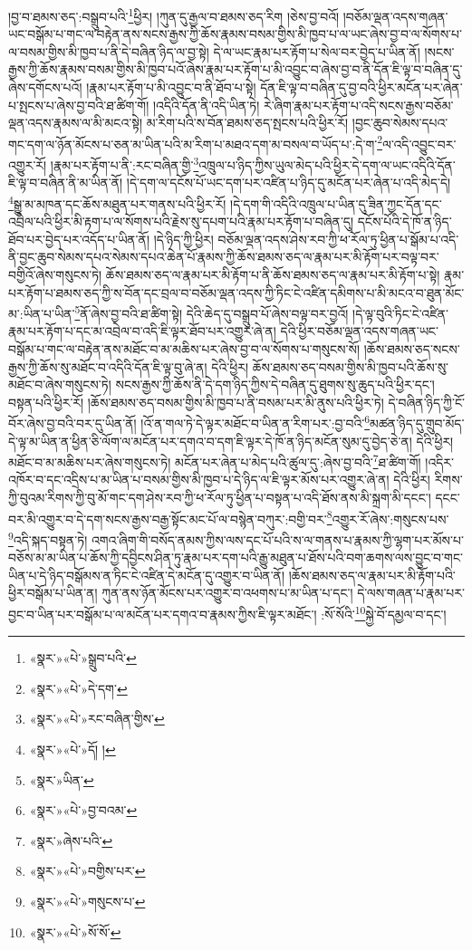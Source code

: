།བྱ་བ་ཐམས་ཅད་:བསྒྲུབ་པའི་\footnote{«སྣར་»«པེ་»སྒྲུབ་པའི་}ཕྱིར། །ཀུན་དུ་རྒྱལ་བ་ཐམས་ཅད་རིག །ཅེས་བྱ་བའོ། །བཅོམ་ལྡན་འདས་གཞན་ཡང་བསྒོམ་པ་གང་ལ་བརྟེན་ནས་སངས་རྒྱས་ཀྱི་ཆོས་རྣམས་བསམ་གྱིས་མི་ཁྱབ་པ་ལ་ཡང་ཞེས་བྱ་བ་ལ་སོགས་པ་ལ་བསམ་གྱིས་མི་ཁྱབ་པ་ནི་དེ་བཞིན་ཉིད་ལ་བྱ་སྟེ། དེ་ལ་ཡང་རྣམ་པར་རྟོག་པ་སེལ་བར་བྱེད་པ་ཡིན་ནོ། །སངས་རྒྱས་ཀྱི་ཆོས་རྣམས་བསམ་གྱིས་མི་ཁྱབ་པའོ་ཞེས་རྣམ་པར་རྟོག་པ་མི་འབྱུང་བ་ཞེས་བྱ་བ་ནི་དོན་ཇི་ལྟ་བ་བཞིན་དུ་ཞེས་དགོངས་པའོ། །རྣམ་པར་རྟོག་པ་མི་འབྱུང་བ་ནི་ཐོབ་པ་སྟེ། དོན་ཇི་ལྟ་བ་བཞིན་དུ་བྱ་བའི་ཕྱིར་མངོན་པར་ཞེན་པ་སྤངས་པ་ཞེས་བྱ་བའི་ཐ་ཚིག་གོ། །འདིའི་དོན་ནི་འདི་ཡིན་ཏེ། རེ་ཞིག་རྣམ་པར་རྟོག་པ་འདི་སངས་རྒྱས་བཅོམ་ལྡན་འདས་རྣམས་ལ་མི་མངའ་སྟེ། མ་རིག་པའི་ས་བོན་ཐམས་ཅད་སྤངས་པའི་ཕྱིར་རོ། །བྱང་ཆུབ་སེམས་དཔའ་གང་དག་ལ་ཉོན་མོངས་པ་ཅན་མ་ཡིན་པའི་མ་རིག་པ་མཐའ་དག་མ་བསལ་བ་ཡོད་པ་:དེ་ག་\footnote{«སྣར་»«པེ་»དེ་དག་}ལ་འདི་འབྱུང་བར་འགྱུར་རོ། །རྣམ་པར་རྟོག་པ་ནི་:རང་བཞིན་གྱི་\footnote{«སྣར་»«པེ་»རང་བཞིན་གྱིས་}འཁྲུལ་པ་ཉིད་ཀྱིས་ཡུལ་མེད་པའི་ཕྱིར་དེ་དག་ལ་ཡང་འདིའི་དོན་ཇི་ལྟ་བ་བཞིན་ནི་མ་ཡིན་ནོ། །དེ་དག་ལ་དངོས་པོ་ཡང་དག་པར་འཛིན་པ་ཉིད་དུ་མངོན་པར་ཞེན་པ་འདི་མེད་དེ། \footnote{«སྣར་»«པེ་»དོ། ། }སྒྱུ་མ་མཁན་དང་ཆོས་མཐུན་པར་གནས་པའི་ཕྱིར་རོ། །དེ་དག་གི་འདིའི་འཁྲུལ་པ་ཡིན་དུ་ཟིན་ཀྱང་དོན་དང་འབྲེལ་པའི་ཕྱིར་མི་རྟག་པ་ལ་སོགས་པའི་རྗེས་སུ་དཔག་པའི་རྣམ་པར་རྟོག་པ་བཞིན་དུ། དངོས་པོའི་དེ་ཁོ་ན་ཉིད་ཐོབ་པར་བྱེད་པར་འདོད་པ་ཡིན་ནོ། །དེ་ཉིད་ཀྱི་ཕྱིར། བཅོམ་ལྡན་འདས་ཤེས་རབ་ཀྱི་ཕ་རོལ་ཏུ་ཕྱིན་པ་སྒོམ་པ་འདི་ནི་བྱང་ཆུབ་སེམས་དཔའ་སེམས་དཔའ་ཆེན་པོ་རྣམས་ཀྱི་ཆོས་ཐམས་ཅད་ལ་རྣམ་པར་མི་རྟོག་པར་བལྟ་བར་བགྱིའོ་ཞེས་གསུངས་ཏེ། ཆོས་ཐམས་ཅད་ལ་རྣམ་པར་མི་རྟོག་པ་ནི་ཆོས་ཐམས་ཅད་ལ་རྣམ་པར་མི་རྟོག་པ་སྟེ། རྣམ་པར་རྟོག་པ་ཐམས་ཅད་ཀྱི་ས་བོན་དང་བྲལ་བ་བཅོམ་ལྡན་འདས་ཀྱི་ཏིང་ངེ་འཛིན་དམིགས་པ་མི་མངའ་བ་ཐུན་མོང་མ་:ཡིན་པ་ཡིན་\footnote{«སྣར་»ཡིན་}ནོ་ཞེས་བྱ་བའི་ཐ་ཚིག་སྟེ། དེའི་ཆེད་དུ་བསྒྲུབ་པོ་ཞེས་བལྟ་བར་བྱའོ། །དེ་ལྟ་བུའི་ཏིང་ངེ་འཛིན་རྣམ་པར་རྟོག་པ་དང་མ་འབྲེལ་བ་འདི་ཇི་ལྟར་ཐོབ་པར་འགྱུར་ཞེ་ན། དེའི་ཕྱིར་བཅོམ་ལྡན་འདས་གཞན་ཡང་བསྒོམ་པ་གང་ལ་བརྟེན་ནས་མཐོང་བ་མ་མཆིས་པར་ཞེས་བྱ་བ་ལ་སོགས་པ་གསུངས་སོ། །ཆོས་ཐམས་ཅད་སངས་རྒྱས་ཀྱི་ཆོས་སུ་མཐོང་བ་འདིའི་དོན་ཇི་ལྟ་བུ་ཞེ་ན། དེའི་ཕྱིར། ཆོས་ཐམས་ཅད་བསམ་གྱིས་མི་ཁྱབ་པའི་ཆོས་སུ་མཐོང་བ་ཞེས་གསུངས་ཏེ། སངས་རྒྱས་ཀྱི་ཆོས་ནི་དེ་དག་ཉིད་ཀྱིས་དེ་བཞིན་དུ་ཐུགས་སུ་ཆུད་པའི་ཕྱིར་དང་། བསྟན་པའི་ཕྱིར་རོ། །ཆོས་ཐམས་ཅད་བསམ་གྱིས་མི་ཁྱབ་པ་ནི་བསམ་པར་མི་ནུས་པའི་ཕྱིར་ཏེ། དེ་བཞིན་ཉིད་ཀྱི་ངོ་བོར་ཞེས་བྱ་བའི་བར་དུ་ཡིན་ནོ། །འོ་ན་གལ་ཏེ་དེ་ལྟར་མཐོང་བ་ཡིན་ན་རིག་པར་:བྱ་བའི་\footnote{«སྣར་»«པེ་»བྱ་བའམ་}མཚན་ཉིད་དུ་གྲུབ་མོད་དེ་ལྟ་མ་ཡིན་ན་ཕྱིན་ཅི་ལོག་ལ་མངོན་པར་དགའ་བ་དག་ཇི་ལྟར་དེ་ཁོ་ན་ཉིད་མངོན་སུམ་དུ་བྱེད་ཅེ་ན། དེའི་ཕྱིར། མཐོང་བ་མ་མཆིས་པར་ཞེས་གསུངས་ཏེ། མངོན་པར་ཞེན་པ་མེད་པའི་ཚུལ་དུ་:ཞེས་བྱ་བའི་\footnote{«སྣར་»ཞེས་པའི་}ཐ་ཚིག་གོ། །འདིར་འཁོར་བ་དང་འདྲིས་པ་མ་ཡིན་པ་བསམ་གྱིས་མི་ཁྱབ་པ་དེ་ཉིད་ལ་ཇི་ལྟར་མོས་པར་འགྱུར་ཞེ་ན། དེའི་ཕྱིར། རིགས་ཀྱི་བུའམ་རིགས་ཀྱི་བུ་མོ་གང་དག་ཤེས་རབ་ཀྱི་ཕ་རོལ་ཏུ་ཕྱིན་པ་བསྟན་པ་འདི་ཐོས་ནས་མི་སྐྲག་མི་དངང་། དངང་བར་མི་འགྱུར་བ་དེ་དག་སངས་རྒྱས་བརྒྱ་སྟོང་མང་པོ་ལ་བསྙེན་བཀུར་:བགྱི་བར་\footnote{«སྣར་»«པེ་»བགྱིས་པར་}འགྱུར་རོ་ཞེས་:གསུངས་པས་\footnote{«སྣར་»«པེ་»གསུངས་པ་}འདི་སྐད་བསྟན་ཏེ། འགའ་ཞིག་གི་བསོད་ནམས་ཀྱིས་ལས་དང་པོ་པའི་ས་ལ་གནས་པ་རྣམས་ཀྱི་ལྷག་པར་མོས་པ་བཅོས་མ་མ་ཡིན་པ་ཆོས་ཀྱི་དབྱིངས་ཤིན་ཏུ་རྣམ་པར་དག་པའི་རྒྱུ་མཐུན་པ་ཐོས་པའི་བག་ཆགས་ལས་བྱུང་བ་གང་ཡིན་པ་དེ་ཉིད་བསྒོམས་ན་ཏིང་ངེ་འཛིན་དེ་མངོན་དུ་འགྱུར་བ་ཡིན་ནོ། །ཆོས་ཐམས་ཅད་ལ་རྣམ་པར་མི་རྟོག་པའི་ཕྱིར་བསྒོམ་པ་ཡིན་ན། ཀུན་ནས་ཉོན་མོངས་པར་འགྱུར་བ་འཕགས་པ་མ་ཡིན་པ་དང་། དེ་ལས་གཞན་པ་རྣམ་པར་བྱང་བ་ཡིན་པར་བསྒོམ་པ་ལ་མངོན་པར་དགའ་བ་རྣམས་ཀྱིས་ཇི་ལྟར་མཐོང་། :སོ་སོའི་\footnote{«སྣར་»«པེ་»སོ་སོ་}སྐྱེ་བོ་དམྱལ་བ་དང་། 